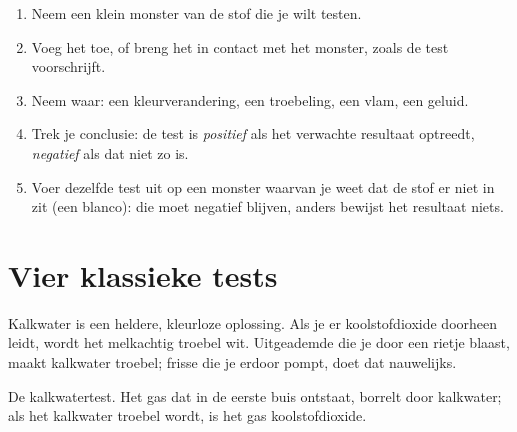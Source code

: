 \begin{method}\label{met:g7:identifying-substances:run}
\begin{enumerate}
  \item Neem een klein monster van de stof die je wilt testen.
  \item Voeg het  toe, of breng het in contact met het monster,
        zoals de test voorschrijft.
  \item Neem waar: een kleurverandering, een troebeling, een vlam, een
        geluid.
  \item Trek je conclusie: de test is \emph{positief} als het verwachte
        resultaat optreedt, \emph{negatief} als dat niet zo is.
  \item Voer dezelfde test uit op een monster waarvan je weet dat de stof
        er niet in zit (een blanco): die moet negatief blijven, anders
        bewijst het resultaat niets.
\end{enumerate}
\end{method}

\section{Vier klassieke tests}

\begin{proposition}\label{prop:g7:identifying-substances:limewater}
Kalkwater is een heldere, kleurloze oplossing. Als je er koolstofdioxide
doorheen leidt, wordt het melkachtig troebel wit. Uitgeademde  die
je door een rietje blaast, maakt kalkwater troebel; frisse  die je
erdoor pompt, doet dat nauwelijks.
\end{proposition}

\begin{omfigure}

{\small De kalkwatertest. Het gas dat in de eerste buis ontstaat, borrelt
door kalkwater; als het kalkwater troebel wordt, is het gas
koolstofdioxide.}
\end{omfigure}

